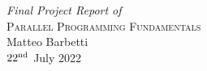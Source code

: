 \begin{center}
    \textit {\Large Final Project Report of}\\[8pt]
    {\LARGE \textsc{Parallel Programming Fundamentals}}\\[12pt]
    {\Large Matteo Barbetti}\\[12pt]
    {\large $22^{\rm{nd}}$ July 2022}
\end{center}